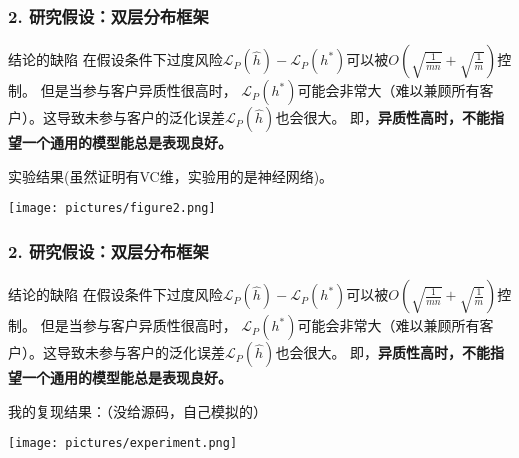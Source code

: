 \documentclass{beamer}
\begin{document}
\begin{frame}
    \frametitle{2. 研究假设：双层分布框架}
    \begin{alertblock}{结论的缺陷}
        在假设条件下过度风险$\mathcal{L}_{P}(\hat{h})-\mathcal{L}_{P}(h^{*})$可以被$O(\sqrt{\frac{1}{mn}}+\sqrt{\frac{1}{m}})$控制。
        但是当参与客户异质性很高时，
        $\mathcal{L}_{P}(h^{*})$可能会非常大（难以兼顾所有客户）。这导致未参与客户的泛化误差$\mathcal{L}_{P}(\hat{h})$也会很大。
        即，\textbf{异质性高时，不能指望一个通用的模型能总是表现良好。}
    \end{alertblock}
    实验结果(虽然证明有VC维，实验用的是神经网络)。
    \begin{center}
        \texttt{[image: pictures/figure2.png]}
    \end{center}
\end{frame}

\begin{frame}
    \frametitle{2. 研究假设：双层分布框架}
    \begin{alertblock}{结论的缺陷}
        在假设条件下过度风险$\mathcal{L}_{P}(\hat{h})-\mathcal{L}_{P}(h^{*})$可以被$O(\sqrt{\frac{1}{mn}}+\sqrt{\frac{1}{m}})$控制。
        但是当参与客户异质性很高时，
        $\mathcal{L}_{P}(h^{*})$可能会非常大（难以兼顾所有客户）。这导致未参与客户的泛化误差$\mathcal{L}_{P}(\hat{h})$也会很大。
        即，\textbf{异质性高时，不能指望一个通用的模型能总是表现良好。}
    \end{alertblock}
    我的复现结果：（没给源码，自己模拟的）
    \begin{center}
        \texttt{[image: pictures/experiment.png]}
    \end{center}
\end{frame}
\end{document}
